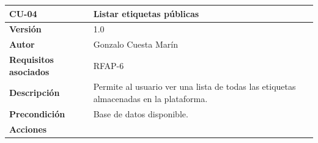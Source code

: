 \documentclass[
]{article}
\begin{document}
\begin{longtable}[]{@{}ll@{}}
\toprule
\begin{minipage}[b]{0.22\columnwidth}\raggedright
\textbf{CU-04}\strut
\end{minipage} & \begin{minipage}[b]{0.72\columnwidth}\raggedright
\textbf{Listar etiquetas públicas}\strut
\end{minipage}\tabularnewline
\midrule
\endhead
\begin{minipage}[t]{0.22\columnwidth}\raggedright
\textbf{Versión}\strut
\end{minipage} & \begin{minipage}[t]{0.72\columnwidth}\raggedright
1.0\strut
\end{minipage}\tabularnewline
\begin{minipage}[t]{0.22\columnwidth}\raggedright
\textbf{Autor}\strut
\end{minipage} & \begin{minipage}[t]{0.72\columnwidth}\raggedright
Gonzalo Cuesta Marín\strut
\end{minipage}\tabularnewline
\begin{minipage}[t]{0.22\columnwidth}\raggedright
\textbf{Requisitos asociados}\strut
\end{minipage} & \begin{minipage}[t]{0.72\columnwidth}\raggedright
RFAP-6\strut
\end{minipage}\tabularnewline
\begin{minipage}[t]{0.22\columnwidth}\raggedright
\textbf{Descripción}\strut
\end{minipage} & \begin{minipage}[t]{0.72\columnwidth}\raggedright
Permite al usuario ver una lista de todas las etiquetas almacenadas en
la plataforma.\strut
\end{minipage}\tabularnewline
\begin{minipage}[t]{0.22\columnwidth}\raggedright
\textbf{Precondición}\strut
\end{minipage} & \begin{minipage}[t]{0.72\columnwidth}\raggedright
Base de datos disponible.\strut
\end{minipage}\tabularnewline
\begin{minipage}[t]{0.22\columnwidth}\raggedright
\textbf{Acciones}\strut
\end{minipage} & \begin{minipage}[t]{0.72\columnwidth}\raggedright
\begin{enumerate}

\end{enumerate}
\end{minipage}
\end{longtable}
\end{document}
